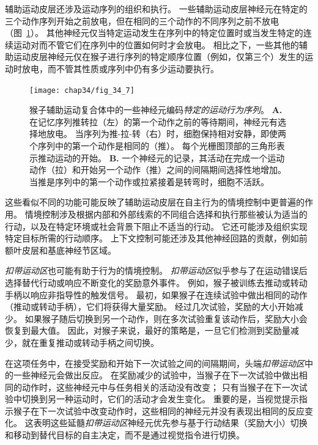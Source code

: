 辅助运动皮层还涉及运动序列的组织和执行。
一些辅助运动皮层神经元在特定的三个动作序列开始之前放电，但在相同的三个动作的不同序列之前不放电（图~\ref{fig:34_7}）。
其他神经元仅当特定运动发生在序列中的特定位置时或当发生特定的连续运动对而不管它们在序列中的位置如何时才会放电。
相比之下，一些其他的辅助运动皮层神经元仅在猴子进行序列的特定顺序位置（例如，仅第三个）发生的运动时放电，而不管其性质或序列中仍有多少运动要执行。


\begin{figure}[htbp]
	\centering
	\texttt{[image: chap34/fig\_34\_7]}
	\caption{猴子辅助运动复合体中的一些神经元编码\textit{特定的运动行为序列}\cite{tanji2001sequential}。
		\textbf{A.} 在记忆序列推转拉（左）的第一个动作之前的等待期间，神经元有选择地放电。
		当序列为推-拉-转（右）时，细胞保持相对安静，即使两个序列中的第一个动作是相同的（推）。
		每个光栅图顶部的三角形表示推动运动的开始。
		\textbf{B.} 一个神经元的记录，其活动在完成一个运动动作（拉）和开始另一个动作（推）之间的间隔期间选择性地增加。
		当推是序列中的第一个动作或拉紧接着是转弯时，细胞不活跃。}
	\label{fig:34_7}
\end{figure}


这些看似不同的功能可能反映了辅助运动皮层在自主行为的情境控制中更普遍的作用。
情境控制涉及根据内部和外部线索的不同组合选择和执行那些被认为适当的行动，以及在特定环境或社会背景下阻止不适当的行动。
它还可能涉及组织实现特定目标所需的行动顺序。
上下文控制可能还涉及其他神经回路的贡献，例如前额叶皮层和基底神经节区域。


\textit{扣带运动区}也可能有助于行为的情境控制。
\textit{扣带运动区}似乎参与了在运动错误后选择替代行动或响应不断变化的奖励意外事件。
例如，猴子被训练去推动或转动手柄以响应非指导性的触发信号。
最初，如果猴子在连续试验中做出相同的动作（推动或转动手柄），它们将获得大量奖励。
经过几次试验，奖励的大小开始减少。
如果猴子随后切换到另一个动作，则在多次试验重复该动作后，奖励大小会恢复到最大值。
因此，对猴子来说，最好的策略是，一旦它们检测到奖励量减少，就在重复推动或转动手柄之间切换。


在这项任务中，在接受奖励和开始下一次试验之间的间隔期间，头端\textit{扣带运动区}中的一些神经元会做出反应。
在奖励减少的试验中，当猴子在下一次试验中做出相同的动作时，这些神经元中与任务相关的活动没有改变；
只有当猴子在下一次试验中切换到另一种运动时，它们的活动才会发生变化。
重要的是，当视觉提示指示猴子在下一次试验中改变动作时，这些相同的神经元并没有表现出相同的反应变化。
这表明这些延髓\textit{扣带运动区}神经元优先参与基于行动结果（奖励大小）切换和移动到替代目标的自主决定，而不是通过视觉指令进行切换。




